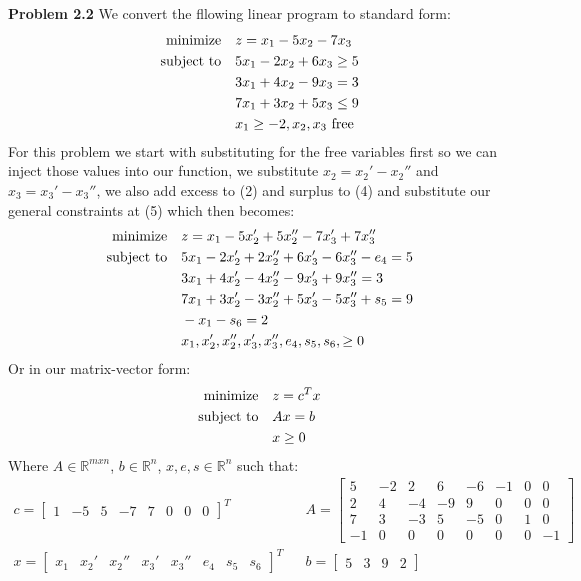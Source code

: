 \documentclass{article}
\begin{document}
\textbf{Problem 2.2} We convert the fllowing linear program to standard form:
\begin{align}
    \text{minimize} &\null \quad z = x_1 - 5x_2 - 7x_3 \\ 
    \text{subject to} &\null \quad 5x_1 - 2x_2 + 6x_3 \geq 5 \\
    & \quad 3x_1 + 4x_2 - 9x_3 = 3 \\
    & \quad 7x_1 + 3x_2 + 5x_3 \leq 9 \\
    & \quad x_1 \geq -2, x_2, x_3 \text{ free}
\end{align}
For this problem we start with substituting for the free variables first so we can inject those values into our function, we substitute $x_2 = x_2' - x_2''$ and $x_3 = x_3' - x_3''$, we also add excess to (2) and surplus to (4) and substitute our general constraints at (5) which then becomes:
\begin{align}
    \text{minimize} &\null \quad z = x_1 - 5x_2' + 5x_2'' - 7x_3' + 7x_3'' \\ 
    \text{subject to} &\null \quad 5x_1 - 2x_2' + 2x_2'' + 6x_3' - 6x_3'' - e_4 = 5 \\
    & \quad 3x_1 + 4x_2' - 4x_2'' - 9x_3' + 9x_3'' = 3 \\
    & \quad 7x_1 + 3x_2' - 3x_2'' + 5x_3'- 5x_3'' + s_5 = 9  \\
    & \quad -x_1 - s_6 = 2 \\ 
    & \quad x_1,x_2',x_2'',x_3', x_3'', e_4, s_5, s_6, \geq 0
\end{align}
Or in our matrix-vector form: 
\begin{align*}
    \text{minimize} &\null \quad z = c^Tx \\
    \text{subject to} &\null \quad Ax=b \\
    & \quad x \geq 0
\end{align*}
Where $A \in \mathbb{R}^{mxn}$, $b \in \mathbb{R}^n$, $x, e, s \in \mathbb{R}^n$ such that:  
\begin{align*}c =
    \begin{bmatrix}
        1 & -5 & 5 & -7 & 7 & 0 & 0 & 0
    \end{bmatrix}^T && A =
    \begin{bmatrix}
        5 & -2 & 2 & 6 & -6 & -1 & 0 & 0 \\
        2 & 4 & -4 & -9 & 9 & 0 & 0 & 0 \\
        7 & 3 & -3 & 5 & -5 & 0 & 1 & 0 \\
        -1 & 0 & 0 & 0 & 0 & 0 & 0 & -1
    \end{bmatrix} \\ x =
    \begin{bmatrix}
        x_1 & x_2' & x_2'' & x_3' & x_3'' & e_4 & s_5 & s_6
    \end{bmatrix}^T && b =
    \begin{bmatrix}
        5 & 3 & 9 & 2
    \end{bmatrix}
\end{align*}
\end{document}
